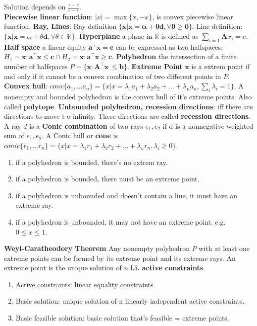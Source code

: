 \documentclass{article}
\def\x{\bm{x}}
\def\d{\bm{d}}
\def\A{\bm{A}}
\def\b{\bm{b}}
\def\Re{\mathbb{R}}
\begin{document}
Solution depends on $\frac{r-c}{r-s}$.\\
\textbf{Piecewise linear function}: $|x|=\max\{x,-x\}$, is convex piecewise linear function.
\textbf{Ray, Lines}: Ray definition $\{\x|\x=\bm{\alpha + \theta \bm{d}, \forall \theta \ge 0}\}$. Line definition: $\{\x|\x = \alpha + \theta \d, \forall \theta \in \Re \}$.
\textbf{Hyperplane} a plane in $\Re$ is defined as $\sum_{i=1}\A x_{i}=c$.
\textbf{Half space} a linear equity $\bm{a}^{\top}\x=\bm{c}$ can be expressed as two halfspaces: $H_1={\x:\bm{a}^{\top}\x \le \bm{c}} \cap H_2={\x:\bm{a}^{\top}\x \ge \bm{c}}$.
\textbf{Polyhedron} the intersection of a finite number of halfspaces $\textit{P}=\{\x: \A^{\top}\x\ \le \b \}$.
\textbf{Extreme Point} $\x$ is a extrem point if and only if it cannot be a convex combination of two different points in $P$.
\textbf{Convex hull}: $conv\{a_1,...a_n\}=\{x|x=\lambda_1 a_1 + \lambda_2 a_2 +...+ \lambda_n a_{n}, \sum_{i} \lambda_{i}=1\}$. A nonempty and bounded polyhedron is the convex hull of it's extreme points. Also called \textbf{polytope}.
\textbf{Unbounded polyhedron, recession directions}: iff there are directions to move t o infinity.  These directions are called \textbf{recession directions}.
A ray $d$ is a \textbf{Conic combination} of two rays $e_1, e_2$ if d is a nonnegative weighted sum of $e_1, e_2$. A Conic hull or \textbf{cone} is $conic\{r_1,...r_n\}=\{x|x=\lambda_1 r_1 + \lambda_2 r_2 +...+ \lambda_n r_{n}, \lambda_i \ge 0 \}$.
\begin{enumerate}
\item if a polyhedron is bounded, there's no extrem ray.
\item if a polyhedron is bounded, there must be an extreme point.\
\item if a polyhedron is unbounded and doesn't contain a line, it must have an extreme ray.
\item if a polyhedron is unbounded, it may not have an extreme point. e.g. $0 \le x \le 1$.    
\end{enumerate}
\textbf{Weyl-Caratheodory Theorem} Any nonempty polyhedron $P$ with at least one extreme points can be formed by its extreme point and its extreme rays.
An extreme point is the unique solution of $n$ \textbf{l.i. active constraints}.
\begin{enumerate}
    \item Active constraints: linear equality constraints.
    \item Basic solution: unique solution of n linearly independent active constraints.
    \item Basic feasible solution: basic solution that's feasible = extreme points.
\end{enumerate}
\end{document}
